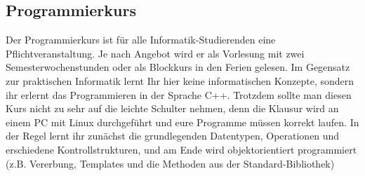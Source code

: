 \subsection{Programmierkurs}
\label{ipk}
Der Programmierkurs ist für alle Informatik-Studierenden eine Pflichtveranstaltung. Je nach Angebot wird er als Vorlesung mit zwei Semesterwochenstunden oder als Blockkurs in den Ferien gelesen. Im Gegensatz zur praktischen Informatik lernt Ihr hier keine informatischen Konzepte, sondern ihr erlernt das Programmieren in der Sprache C++. Trotzdem sollte man diesen Kurs nicht zu sehr auf die leichte Schulter nehmen, denn die Klausur wird an einem PC mit Linux durchgeführt und eure Programme müssen korrekt laufen. In der Regel lernt ihr zunächst die grundlegenden Datentypen, Operationen und erschiedene Kontrollstrukturen, und am Ende wird objektorientiert programmiert (z.B. Vererbung, Templates und die Methoden aus der Standard-Bibliothek)
